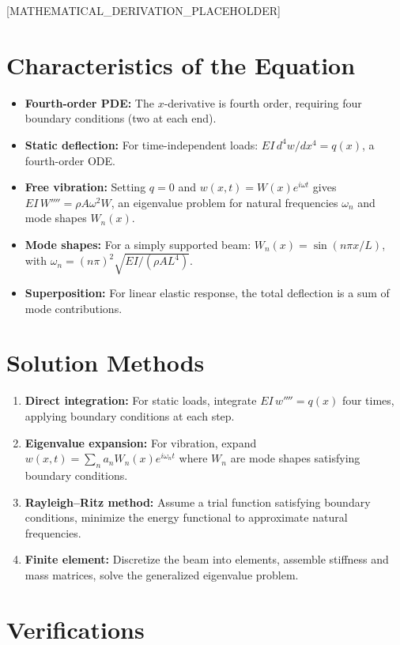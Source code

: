 \documentclass[11pt,openright]{book}
\begin{document}
[MATHEMATICAL_DERIVATION_PLACEHOLDER]

\section*{Characteristics of the Equation}

\begin{itemize}
\item \textbf{Fourth-order PDE:} The $x$-derivative is fourth order, requiring four boundary conditions (two at each end).
\item \textbf{Static deflection:} For time-independent loads: $EI \, d^4w/dx^4 = q(x)$, a fourth-order ODE.
\item \textbf{Free vibration:} Setting $q = 0$ and $w(x,t) = W(x)e^{i\omega t}$ gives $EI \, W'''' = \rho A \omega^2 W$, an eigenvalue problem for natural frequencies $\omega_n$ and mode shapes $W_n(x)$.
\item \textbf{Mode shapes:} For a simply supported beam: $W_n(x) = \sin(n\pi x/L)$, with $\omega_n = (n\pi)^2 \sqrt{EI/(\rho A L^4)}$.
\item \textbf{Superposition:} For linear elastic response, the total deflection is a sum of mode contributions.
\end{itemize}
\section*{Solution Methods}

\begin{enumerate}
\item \textbf{Direct integration:} For static loads, integrate $EI \, w'''' = q(x)$ four times, applying boundary conditions at each step.
\item \textbf{Eigenvalue expansion:} For vibration, expand $w(x,t) = \sum_n a_n W_n(x) e^{i\omega_n t}$ where $W_n$ are mode shapes satisfying boundary conditions.
\item \textbf{Rayleigh--Ritz method:} Assume a trial function satisfying boundary conditions, minimize the energy functional to approximate natural frequencies.
\item \textbf{Finite element:} Discretize the beam into elements, assemble stiffness and mass matrices, solve the generalized eigenvalue problem.
\end{enumerate}
\section*{Verifications}
\end{document}
